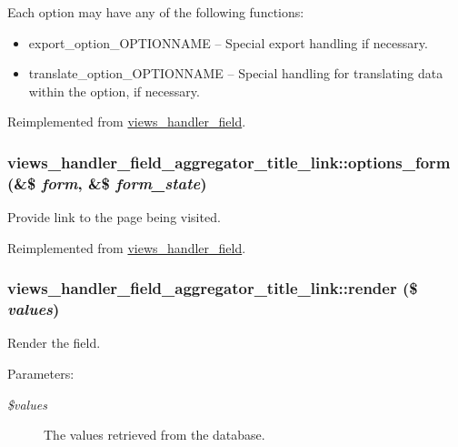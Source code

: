  Each option may have any of the following functions:\begin{itemize}
\item export\_\-option\_\-OPTIONNAME -- Special export handling if necessary.\item translate\_\-option\_\-OPTIONNAME -- Special handling for translating data within the option, if necessary. \end{itemize}


Reimplemented from \hyperlink{classviews__handler__field_64c69a8a3697603f8283405071c25b76}{views\_\-handler\_\-field}.\hypertarget{classviews__handler__field__aggregator__title__link_6ebe6b2dc8c306fc32258be795f21f3b}{
\subsubsection[{options\_\-form}]{\setlength{\rightskip}{0pt plus 5cm}views\_\-handler\_\-field\_\-aggregator\_\-title\_\-link::options\_\-form (\&\$ {\em form}, \/  \&\$ {\em form\_\-state})}}
\label{classviews__handler__field__aggregator__title__link_6ebe6b2dc8c306fc32258be795f21f3b}


Provide link to the page being visited. 

Reimplemented from \hyperlink{classviews__handler__field_0435d161922b7b4b84f02a2e79bb947a}{views\_\-handler\_\-field}.\hypertarget{classviews__handler__field__aggregator__title__link_1b3d319f7a95e1885726a975f1755b9f}{
\subsubsection[{render}]{\setlength{\rightskip}{0pt plus 5cm}views\_\-handler\_\-field\_\-aggregator\_\-title\_\-link::render (\$ {\em values})}}
\label{classviews__handler__field__aggregator__title__link_1b3d319f7a95e1885726a975f1755b9f}


Render the field.

\begin{Desc}
\item[Parameters:]
\begin{description}
\item[{\em \$values}]The values retrieved from the database. \end{description}
\end{Desc}


